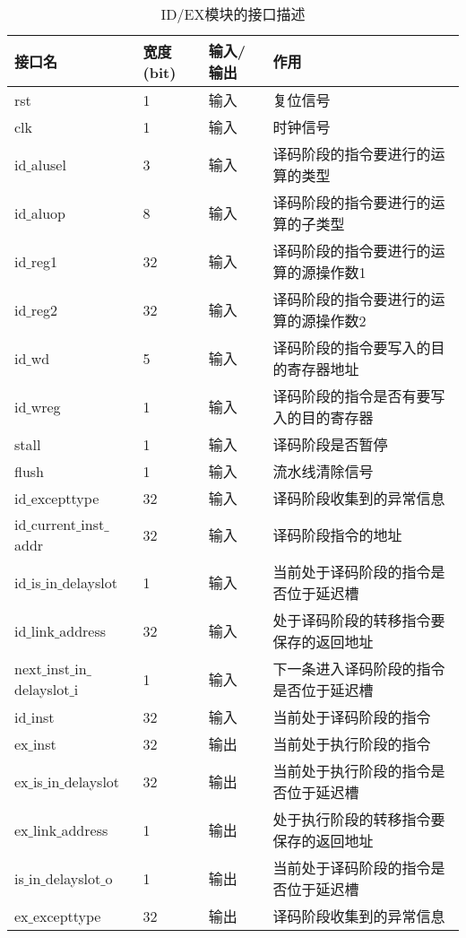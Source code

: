 \quad
\begin{table}[H]
	\centering
	\caption{ID/EX模块的接口描述}
	\begin{tabular}{|l|l|l|l|}
		\hline
		接口名 & 宽度(bit) & 输入/输出 & 作用 \\
		\hline
		rst & 1 & 输入 & 复位信号 \\
		\hline
		clk & 1 & 输入 & 时钟信号 \\
		\hline
		id$\_$alusel & 3 & 输入 & 译码阶段的指令要进行的运算的类型 \\
		\hline
		id$\_$aluop & 8 & 输入 & 译码阶段的指令要进行的运算的子类型 \\
		\hline
		id$\_$reg1 & 32 & 输入 & 译码阶段的指令要进行的运算的源操作数1 \\
		\hline
		id$\_$reg2 & 32 & 输入 & 译码阶段的指令要进行的运算的源操作数2 \\
		\hline
		id$\_$wd & 5 & 输入 & 译码阶段的指令要写入的目的寄存器地址 \\
		\hline
		id$\_$wreg & 1 & 输入 & 译码阶段的指令是否有要写入的目的寄存器 \\
		\hline
		stall & 1 & 输入 & 译码阶段是否暂停 \\
		\hline
		flush & 1 & 输入 & 流水线清除信号 \\
		\hline
		id$\_$excepttype & 32 & 输入 & 译码阶段收集到的异常信息 \\
		\hline
		id$\_$current$\_$inst$\_$addr & 32 & 输入 & 译码阶段指令的地址 \\
		\hline
		id$\_$is$\_$in$\_$delayslot & 1 & 输入 & 当前处于译码阶段的指令是否位于延迟槽 \\
		\hline
		id$\_$link$\_$address & 32 & 输入 & 处于译码阶段的转移指令要保存的返回地址 \\
		\hline
		next$\_$inst$\_$in$\_$delayslot$\_$i & 1 & 输入 & 下一条进入译码阶段的指令是否位于延迟槽 \\
		\hline
		id$\_$inst & 32 & 输入 & 当前处于译码阶段的指令 \\
		\hline
		ex$\_$inst & 32 & 输出 & 当前处于执行阶段的指令 \\
		\hline
		ex$\_$is$\_$in$\_$delayslot & 32 & 输出 & 当前处于执行阶段的指令是否位于延迟槽 \\
		\hline
		ex$\_$link$\_$address & 1 & 输出 & 处于执行阶段的转移指令要保存的返回地址 \\
		\hline
		is$\_$in$\_$delayslot$\_$o & 1 & 输出 & 当前处于译码阶段的指令是否位于延迟槽 \\
		\hline
		ex$\_$excepttype & 32 & 输出 & 译码阶段收集到的异常信息 \\

\end{tabular}
\end{table}
